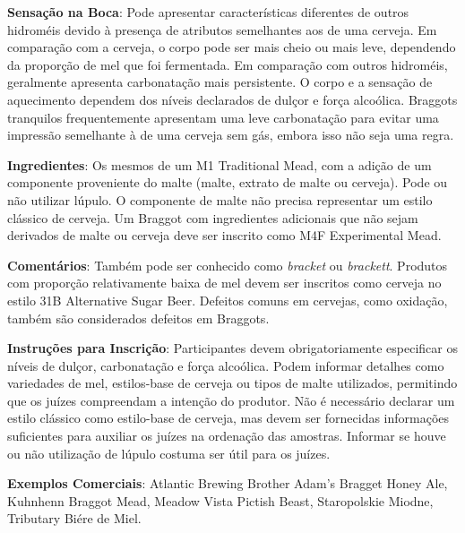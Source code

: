 \textbf{Sensação na Boca}: Pode apresentar características diferentes de outros hidroméis devido à presença de atributos semelhantes aos de uma cerveja. Em comparação com a cerveja, o corpo pode ser mais cheio ou mais leve, dependendo da proporção de mel que foi fermentada. Em comparação com outros hidroméis, geralmente apresenta carbonatação mais persistente. O corpo e a sensação de aquecimento dependem dos níveis declarados de dulçor e força alcoólica. Braggots tranquilos frequentemente apresentam uma leve carbonatação para evitar uma impressão semelhante à de uma cerveja sem gás, embora isso não seja uma regra.

\textbf{Ingredientes}: Os mesmos de um M1 Traditional Mead, com a adição de um componente proveniente do malte (malte, extrato de malte ou cerveja). Pode ou não utilizar lúpulo. O componente de malte não precisa representar um estilo clássico de cerveja. Um Braggot com ingredientes adicionais que não sejam derivados de malte ou cerveja deve ser inscrito como M4F Experimental Mead.

\textbf{Comentários}: Também pode ser conhecido como \textit{bracket} ou \textit{brackett}. Produtos com proporção relativamente baixa de mel devem ser inscritos como cerveja no estilo 31B Alternative Sugar Beer. Defeitos comuns em cervejas, como oxidação, também são considerados defeitos em Braggots.

\textbf{Instruções para Inscrição}: Participantes devem obrigatoriamente especificar os níveis de dulçor, carbonatação e força alcoólica. Podem informar detalhes como variedades de mel, estilos-base de cerveja ou tipos de malte utilizados, permitindo que os juízes compreendam a intenção do produtor. Não é necessário declarar um estilo clássico como estilo-base de cerveja, mas devem ser fornecidas informações suficientes para auxiliar os juízes na ordenação das amostras. Informar se houve ou não utilização de lúpulo costuma ser útil para os juízes.

\textbf{Exemplos Comerciais}: Atlantic Brewing Brother Adam's Bragget Honey Ale, Kuhnhenn Braggot Mead, Meadow Vista Pictish Beast, Staropolskie Miodne, Tributary Biére de Miel.